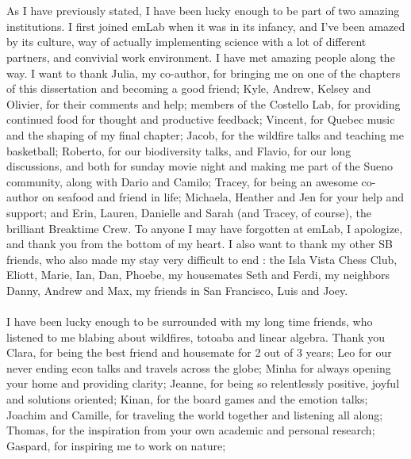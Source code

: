 \\\\
As I have previously stated, I have been lucky enough to be part of two amazing institutions. I first joined emLab when it was in its infancy, and I've been amazed by its culture, way of actually implementing science with a lot of different partners, and convivial work environment. I have met amazing people along the way. I want to thank Julia, my co-author, for bringing me on one of the chapters of this dissertation and becoming a good friend; Kyle, Andrew, Kelsey and Olivier, for their comments and help; members of the Costello Lab, for providing continued food for thought and productive feedback; Vincent, for Quebec music and the shaping of my final chapter; Jacob, for the wildfire talks and teaching me basketball; Roberto, for our biodiversity talks, and Flavio, for our long discussions, and both for sunday movie night and making me part of the Sueno community, along with Dario and Camilo; Tracey, for being an awesome co-author on seafood and friend in life; Michaela, Heather and Jen for your help and support; and Erin, Lauren, Danielle and Sarah (and Tracey, of course), the brilliant Breaktime Crew. To anyone I may have forgotten at emLab, I apologize, and thank you from the bottom of my heart. I also want to thank my other SB friends, who also made my stay very difficult to end : the Isla Vista Chess Club, Eliott, Marie, Ian, Dan, Phoebe, my housemates Seth and Ferdi, my neighbors Danny, Andrew and Max, my friends in San Francisco, Luis and Joey. 
\\\\
I have been lucky enough to be surrounded with my long time friends, who listened to me blabing about wildfires, totoaba and linear algebra. Thank you Clara, for being the best friend and housemate for 2 out of 3 years; Leo for our never ending econ talks and travels across the globe; Minha for always opening your home and providing clarity;  Jeanne, for being so relentlessly positive, joyful and solutions oriented; Kinan, for the board games and the emotion talks; Joachim and Camille, for traveling the world together and listening all along; Thomas, for the inspiration from your own academic and personal research; Gaspard, for inspiring me to work on nature;
